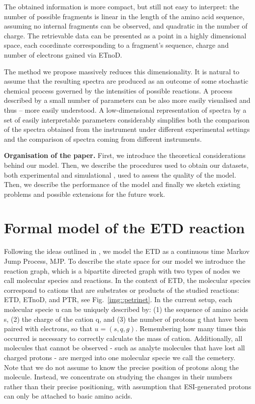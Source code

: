 \documentclass{llncs}
\begin{document}
        The obtained information is more compact, but still not easy to interpret: the number of possible fragments is linear in the length of the amino acid sequence, assuming no internal fragments can be observed, and quadratic in the number of charge. The retrievable data can be presented as a point in a highly dimensional space, each coordinate corresponding to a fragment’s sequence, charge and number of electrons gained via ETnoD.

        The method we propose massively reduces this dimensionality. It is natural to assume that the resulting spectra are produced as an outcome of some stochastic chemical process governed by the intensities of possible reactions. A process described by a small number of parameters can be also more easily visualised and thus -- more easily understood. A low-dimensional representation of spectra by a set of easily interpretable parameters considerably simplifies both the comparison of the spectra obtained from the instrument under different experimental settings and the comparison of spectra coming from different instruments.

\textbf{Organisation of the paper.}
        First, we introduce the theoretical considerations behind our model. Then, we describe the procedures used to obtain our datasets, both experimental and  simulational , used to assess the quality of the model. Then, we describe the performance of the model and finally we sketch existing problems and possible extensions for the future work.


\section{Formal model of the ETD reaction}

        Following the ideas outlined in \cite{Gambin2010}, we model the ETD as a continuous time Markov Jump Process, MJP. To describe the state space for our model we introduce the reaction graph, which is a bipartite directed graph with two types of nodes we call molecular species and reactions. In the context of ETD, the molecular species correspond to cations that are substrates or products of the studied reactions: ETD, ETnoD, and PTR, see Fig.~\ref{img::petrinet}. In the current setup, each molecular specie u can be uniquely described by: (1) the sequence of amino acids s, (2) the charge of the cation q, and (3) the number of protons g that have been paired with electrons, so that $u = (s,q,g)$. Remembering how many times this occurred is necessary to correctly calculate the mass of cation.  Additionally, all molecules that cannot be observed - such as analyte molecules that have lost all charged protons - are merged into one molecular specie we call the cemetery. Note that we do not assume to know the precise position of protons along the molecule. Instead, we concentrate on studying the changes in their numbers rather than their precise positioning, with assumption that ESI-generated protons can only be attached to basic amino acids.
\end{document}
